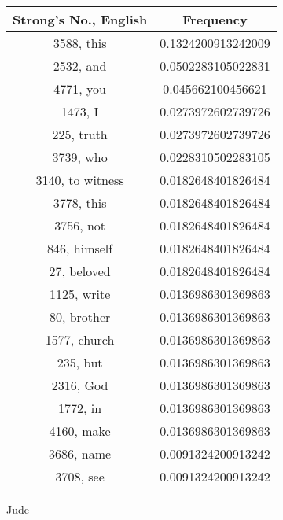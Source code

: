 \documentclass[12pt,letterpaper]{article}
\begin{document}
 \begin{longtable}{|c|c|}
\hline
 Strong's No., English & Frequency \\ \hline  
3588, this & 0.1324200913242009\\ \hline 
 2532, and & 0.0502283105022831\\ \hline 
 4771, you & 0.045662100456621\\ \hline 
 1473, I & 0.0273972602739726\\ \hline 
 225, truth & 0.0273972602739726\\ \hline 
 3739, who & 0.0228310502283105\\ \hline 
 3140, to witness & 0.0182648401826484\\ \hline 
 3778, this & 0.0182648401826484\\ \hline 
 3756, not & 0.0182648401826484\\ \hline 
 846, himself & 0.0182648401826484\\ \hline 
 27, beloved & 0.0182648401826484\\ \hline 
 1125, write & 0.0136986301369863\\ \hline 
 80, brother & 0.0136986301369863\\ \hline 
 1577, church & 0.0136986301369863\\ \hline 
 235, but & 0.0136986301369863\\ \hline 
 2316, God & 0.0136986301369863\\ \hline 
 1772, in & 0.0136986301369863\\ \hline 
 4160, make & 0.0136986301369863\\ \hline 
 3686, name & 0.0091324200913242\\ \hline 
 3708, see & 0.0091324200913242\\ \hline 
\end{longtable} 
 

Jude
\end{document}
